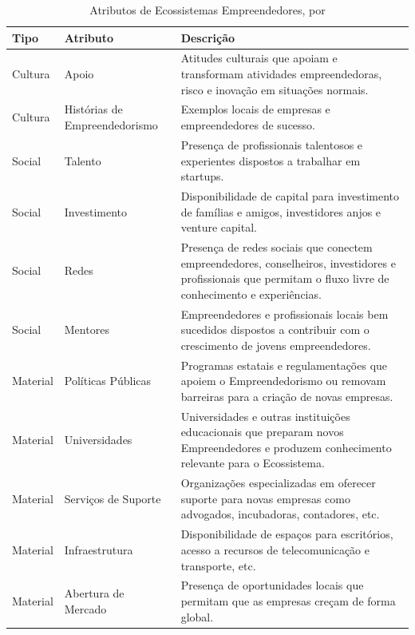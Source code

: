\begin{table}[!htb]
	\centering
	\label{tabela:attributes_of_entrepreneurship_ecosystems}
	\begin{tabular}{ | p{3cm} | p{4cm} | p{8cm} | }
		\hline
		Tipo & Atributo & Descrição \\ \hline
		Cultura & Apoio & Atitudes culturais que apoiam e transformam atividades empreendedoras, risco e inovação em situações normais. \\ \hline
		Cultura & Histórias de Empreendedorismo & Exemplos locais de empresas e empreendedores de sucesso. \\ \hline
		Social & Talento & Presença de profissionais talentosos e experientes dispostos a trabalhar em startups. \\ \hline
		Social & Investimento & Disponibilidade de capital para investimento de famílias e amigos, investidores anjos e venture capital. \\ \hline
		Social & Redes & Presença de redes sociais que conectem empreendedores, conselheiros, investidores e profissionais que permitam o fluxo livre de conhecimento e experiências. \\ \hline
		Social & Mentores & Empreendedores e profissionais locais bem sucedidos dispostos a contribuir com o crescimento de jovens empreendedores. \\ \hline
		Material & Políticas Públicas & Programas estatais e regulamentações que apoiem o Empreendedorismo ou removam barreiras para a criação de novas empresas. \\ \hline
		Material & Universidades & Universidades e outras instituições educacionais que preparam novos Empreendedores e produzem conhecimento relevante para o Ecossistema. \\ \hline
		Material & Serviços de Suporte & Organizações especializadas em oferecer suporte para novas empresas como advogados, incubadoras, contadores, etc. \\ \hline
		Material & Infraestrutura & Disponibilidade de espaços para escritórios, acesso a recursos de telecomunicação e transporte, etc. \\ \hline
		Material & Abertura de Mercado & Presença de oportunidades locais que permitam que as empresas creçam de forma global. \\ \hline
	\end{tabular}
	\caption{Atributos de Ecossistemas Empreendedores, por \cite{Spigel2015}}
\end{table}

